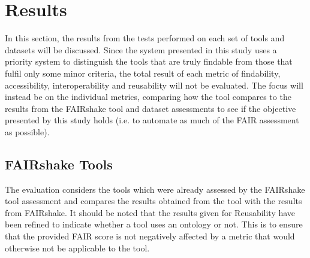 \documentclass{cisfyp}
\begin{document}
\section{Results}
In this section, the results from the tests performed on each set of tools and datasets will be discussed. Since the system presented in this study uses a priority system to distinguish the tools that are truly findable from those that fulfil only some minor criteria, the total result of each metric of findability, accessibility, interoperability and reusability will not be evaluated. The focus will instead be on the individual metrics, comparing how the tool compares to the results from the FAIRshake tool and dataset assessments \cite{FAIRshake} to see if the objective presented by this study holds (i.e. to automate as much of the FAIR assessment as possible). 
\subsection{FAIRshake Tools}
The evaluation considers the tools which were already assessed by the FAIRshake tool assessment \cite{FAIRshake} and compares the results obtained from the tool with the results from FAIRshake. It should be noted that the results given for Reusability have been refined to indicate whether a tool uses an ontology or not. This is to ensure that the provided FAIR score is not negatively affected by a metric that would otherwise not be applicable to the tool. 
\end{document}
